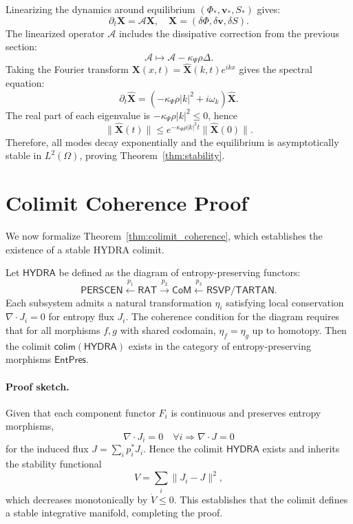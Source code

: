 \documentclass[12pt]{book}
\theoremstyle{definition}
\begin{document}
Linearizing the dynamics around equilibrium $(\Phi_*, \mathbf{v}_*, S_*)$ gives:
\begin{equation}
\partial_t \mathbf{X} = \mathcal{A}\mathbf{X}, \quad \mathbf{X} = (\delta \Phi, \delta \mathbf{v}, \delta S).
\end{equation}
The linearized operator $\mathcal{A}$ includes the dissipative correction from the previous section:
\begin{equation}
\mathcal{A} \mapsto \mathcal{A} - \kappa_\Psi \rho \Delta.
\end{equation}
Taking the Fourier transform $\mathbf{X}(x,t) = \hat{\mathbf{X}}(k,t)e^{ikx}$ gives the spectral equation:
\begin{equation}
\partial_t \hat{\mathbf{X}} = (-\kappa_\Psi \rho |k|^2 + i\omega_k) \hat{\mathbf{X}}.
\end{equation}
The real part of each eigenvalue is $-\kappa_\Psi \rho |k|^2 \le 0$, hence
\begin{equation}
\|\hat{\mathbf{X}}(t)\| \le e^{-\kappa_\Psi \rho |k|^2 t}\|\hat{\mathbf{X}}(0)\|.
\end{equation}
Therefore, all modes decay exponentially and the equilibrium is asymptotically stable in $L^2(\Omega)$, proving Theorem~\ref{thm:stability}.


\section{Colimit Coherence Proof}
We now formalize Theorem~\ref{thm:colimit_coherence}, which establishes the existence of a stable HYDRA colimit.

Let $\mathsf{HYDRA}$ be defined as the diagram of entropy-preserving functors:
\begin{equation}
\mathsf{PERSCEN} \xleftarrow{p_1} \mathsf{RAT} \xrightarrow{p_2} \mathsf{CoM} \xleftarrow{p_3} \mathsf{RSVP/TARTAN}.
\end{equation}
Each subsystem admits a natural transformation $\eta_i$ satisfying local conservation $\nabla \cdot J_i = 0$ for entropy flux $J_i$.
The coherence condition for the diagram requires that for all morphisms $f,g$ with shared codomain, $\eta_f = \eta_g$ up to homotopy.  
Then the colimit $\textsf{colim}(\mathsf{HYDRA})$ exists in the category of entropy-preserving morphisms $\mathsf{EntPres}$.

\paragraph{Proof sketch.}
Given that each component functor $F_i$ is continuous and preserves entropy morphisms,
\begin{equation}
\nabla \cdot J_i = 0 \quad \forall i \Rightarrow \nabla \cdot J = 0
\end{equation}
for the induced flux $J = \sum_i p_i^\ast J_i$.
Hence the colimit $\mathsf{HYDRA}$ exists and inherits the stability functional
\begin{equation}
V = \sum_i \|J_i - J\|^2,
\end{equation}
which decreases monotonically by $\dot{V} \le 0$.  
This establishes that the colimit defines a stable integrative manifold, completing the proof.
\end{document}
